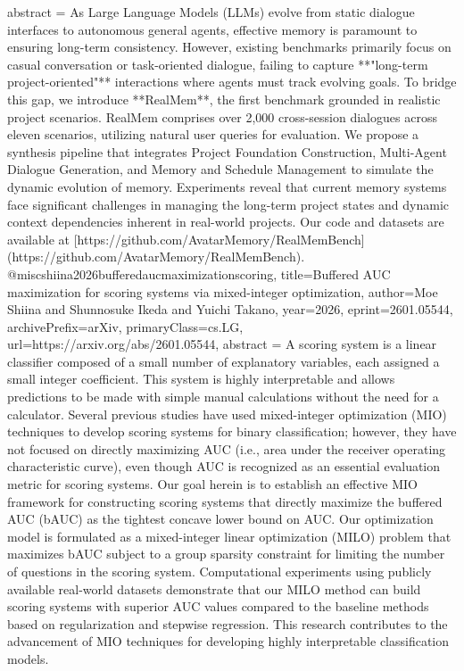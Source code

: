 {      abstract = {As Large Language Models (LLMs) evolve from static dialogue interfaces to autonomous general agents, effective memory is paramount to ensuring long-term consistency. However, existing benchmarks primarily focus on casual conversation or task-oriented dialogue, failing to capture **"long-term project-oriented"** interactions where agents must track evolving goals.   To bridge this gap, we introduce **RealMem**, the first benchmark grounded in realistic project scenarios. RealMem comprises over 2,000 cross-session dialogues across eleven scenarios, utilizing natural user queries for evaluation.   We propose a synthesis pipeline that integrates Project Foundation Construction, Multi-Agent Dialogue Generation, and Memory and Schedule Management to simulate the dynamic evolution of memory. Experiments reveal that current memory systems face significant challenges in managing the long-term project states and dynamic context dependencies inherent in real-world projects.   Our code and datasets are available at [https://github.com/AvatarMemory/RealMemBench](https://github.com/AvatarMemory/RealMemBench).}
}@misc{shiina2026bufferedaucmaximizationscoring,
      title={Buffered AUC maximization for scoring systems via mixed-integer optimization}, 
      author={Moe Shiina and Shunnosuke Ikeda and Yuichi Takano},
      year={2026},
      eprint={2601.05544},
      archivePrefix={arXiv},
      primaryClass={cs.LG},
      url={https://arxiv.org/abs/2601.05544},
      abstract = {A scoring system is a linear classifier composed of a small number of explanatory variables, each assigned a small integer coefficient. This system is highly interpretable and allows predictions to be made with simple manual calculations without the need for a calculator. Several previous studies have used mixed-integer optimization (MIO) techniques to develop scoring systems for binary classification; however, they have not focused on directly maximizing AUC (i.e., area under the receiver operating characteristic curve), even though AUC is recognized as an essential evaluation metric for scoring systems. Our goal herein is to establish an effective MIO framework for constructing scoring systems that directly maximize the buffered AUC (bAUC) as the tightest concave lower bound on AUC. Our optimization model is formulated as a mixed-integer linear optimization (MILO) problem that maximizes bAUC subject to a group sparsity constraint for limiting the number of questions in the scoring system. Computational experiments using publicly available real-world datasets demonstrate that our MILO method can build scoring systems with superior AUC values compared to the baseline methods based on regularization and stepwise regression. This research contributes to the advancement of MIO techniques for developing highly interpretable classification models.}
}
